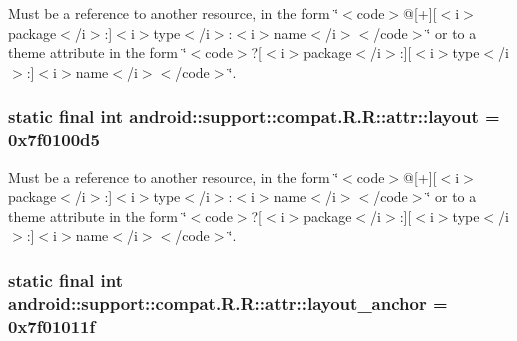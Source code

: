Must be a reference to another resource, in the form \char`\"{}$<$code$>$@\mbox{[}+\mbox{]}\mbox{[}$<$i$>$package$<$/i$>$:\mbox{]}$<$i$>$type$<$/i$>$:$<$i$>$name$<$/i$>$$<$/code$>$\char`\"{} or to a theme attribute in the form \char`\"{}$<$code$>$?\mbox{[}$<$i$>$package$<$/i$>$:\mbox{]}\mbox{[}$<$i$>$type$<$/i$>$:\mbox{]}$<$i$>$name$<$/i$>$$<$/code$>$\char`\"{}. \hypertarget{classandroid_1_1support_1_1compat_1_1_r_1_1attr_1dfad023832966383086a60dcbbf4371}{
\subsubsection[{layout}]{\setlength{\rightskip}{0pt plus 5cm}static final int android::support::compat.R.R::attr::layout = 0x7f0100d5}}
\label{classandroid_1_1support_1_1compat_1_1_r_1_1attr_1dfad023832966383086a60dcbbf4371}


Must be a reference to another resource, in the form \char`\"{}$<$code$>$@\mbox{[}+\mbox{]}\mbox{[}$<$i$>$package$<$/i$>$:\mbox{]}$<$i$>$type$<$/i$>$:$<$i$>$name$<$/i$>$$<$/code$>$\char`\"{} or to a theme attribute in the form \char`\"{}$<$code$>$?\mbox{[}$<$i$>$package$<$/i$>$:\mbox{]}\mbox{[}$<$i$>$type$<$/i$>$:\mbox{]}$<$i$>$name$<$/i$>$$<$/code$>$\char`\"{}. \hypertarget{classandroid_1_1support_1_1compat_1_1_r_1_1attr_74ce8c3d4f48c2e3dcf9927fbcc3176b}{
\subsubsection[{layout\_\-anchor}]{\setlength{\rightskip}{0pt plus 5cm}static final int android::support::compat.R.R::attr::layout\_\-anchor = 0x7f01011f}}
\label{classandroid_1_1support_1_1compat_1_1_r_1_1attr_74ce8c3d4f48c2e3dcf9927fbcc3176b}


